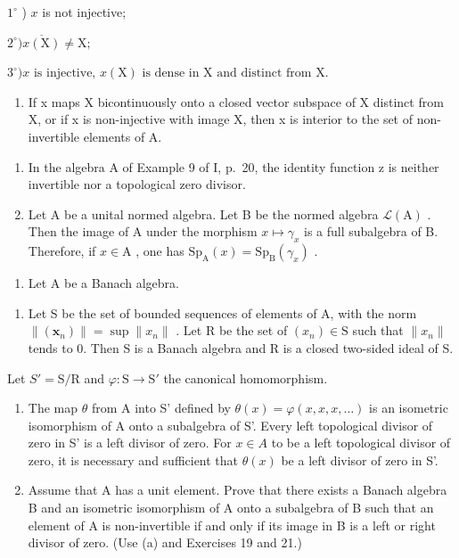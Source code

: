 \(1^{\circ}\) ) \(x\) is not injective;

\(2^{\circ})\overline{x(\mathrm{X})}\neq \mathrm{X};\)

\(3^{\circ}) x \text{ is injective, } x(\mathrm{X}) \text{ is dense in X and distinct from X.}\)

\begin{enumerate}
\def\labelenumi{\alph{enumi})}
\setcounter{enumi}{1}
\tightlist
\item
  If x maps X bicontinuously onto a closed vector subspace of X distinct from X, or if x is non-injective with image X, then x is interior to the set of non-invertible elements of A.
\end{enumerate}

\begin{enumerate}
\def\labelenumi{\arabic{enumi})}
\setcounter{enumi}{19}
\item
  In the algebra A of Example 9 of I, p.~20, the identity function z is neither invertible nor a topological zero divisor.
\item
  Let A be a unital normed algebra. Let B be the normed algebra \(\mathcal{L}(\mathrm{A})\) . Then the image of A under the morphism \(x \mapsto \gamma_x\) is a full subalgebra of B. Therefore, if \(x \in \mathrm{A}\) , one has \(\mathrm{Sp}_{\mathrm{A}}(x) = \mathrm{Sp}_{\mathrm{B}}(\gamma_x)\) .
\end{enumerate}

\begin{enumerate}
\def\labelenumi{¶ \arabic{enumi})}
\setcounter{enumi}{21}
\tightlist
\item
  Let A be a Banach algebra.
\end{enumerate}

\begin{enumerate}
\def\labelenumi{\alph{enumi})}
\tightlist
\item
  Let S be the set of bounded sequences of elements of A, with the norm \(\|(\boldsymbol{x}_{n})\| = \sup \|x_{n}\|\) . Let R be the set of \((x_{n}) \in \mathrm{S}\) such that \(\|x_{n}\|\) tends to 0. Then S is a Banach algebra and R is a closed two-sided ideal of S.
\end{enumerate}

Let \(S' = \text{S/R}\) and \(\varphi: \text{S} \to \text{S}'\) the canonical homomorphism.

\begin{enumerate}
\def\labelenumi{\alph{enumi})}
\setcounter{enumi}{1}
\item
  The map \(\theta\) from A into S' defined by \(\theta(x) = \varphi(x, x, x, \ldots)\) is an isometric isomorphism of A onto a subalgebra of S'. Every left topological divisor of zero in S' is a left divisor of zero. For \(x \in A\) to be a left topological divisor of zero, it is necessary and sufficient that \(\theta(x)\) be a left divisor of zero in S'.
\item
  Assume that A has a unit element. Prove that there exists a Banach algebra B and an isometric isomorphism of A onto a subalgebra of B such that an element of A is non-invertible if and only if its image in B is a left or right divisor of zero. (Use (a) and Exercises 19 and 21.)
\end{enumerate}

